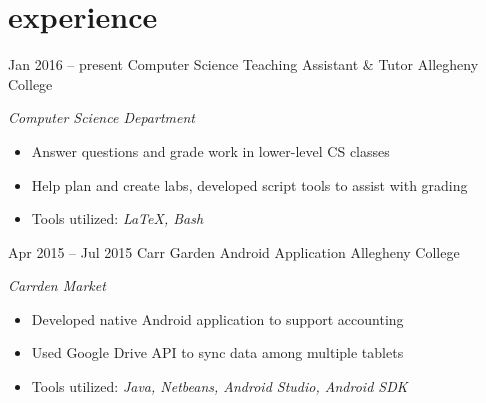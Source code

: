 \documentclass[]{friggeri-cv}
\begin{document}
\section{experience}
\begin{entrylist}
  \entry
    {Jan 2016 -- present}
    {Computer Science Teaching Assistant \& Tutor}
    {Allegheny College}
    {\emph{Computer Science Department}
    \begin{itemize}[leftmargin=1.2em]
    \item Answer questions and grade work in lower-level CS classes
    \item Help plan and create labs, developed script tools to assist with grading
    \item Tools utilized: \emph{\LaTeX , Bash}
    \end{itemize}}
  \entry
    {Apr 2015 -- Jul 2015}
    {Carr Garden Android Application}
    {Allegheny College}
    {\emph{Carrden Market}
    \begin{itemize}[leftmargin=1.2em]
    \item Developed native Android application to support accounting
    \item Used Google Drive API to sync data among multiple tablets
    \item Tools utilized: \emph{Java, Netbeans, Android Studio, Android SDK}
    \end{itemize}}
\end{entrylist}
\end{document}
